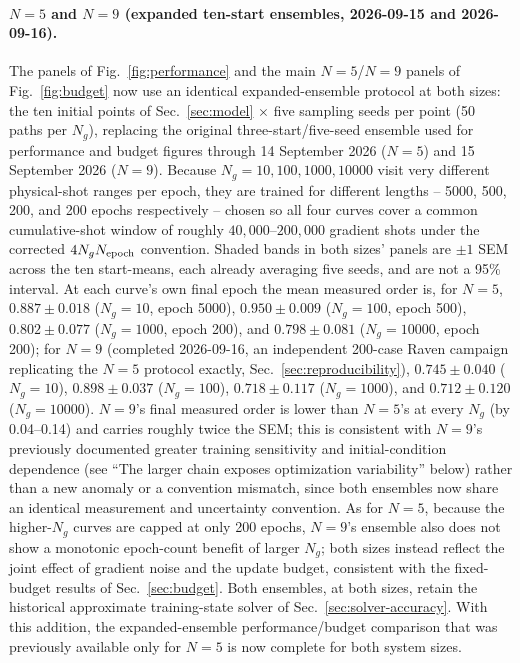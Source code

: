 \documentclass[11pt]{article}
\begin{document}
\paragraph{$N=5$ and $N=9$ (expanded ten-start ensembles, 2026-09-15 and 2026-09-16).}
The panels of Fig.~\ref{fig:performance} and the main $N=5$/$N=9$ panels of
Fig.~\ref{fig:budget} now use an identical expanded-ensemble protocol at both sizes:
the ten initial points of Sec.~\ref{sec:model} $\times$ five sampling seeds per point
(50 paths per $N_g$), replacing the original three-start/five-seed ensemble used for
performance and budget figures through 14 September 2026 ($N=5$) and 15 September
2026 ($N=9$).  Because $N_g=10,100,1000,10000$ visit very different physical-shot
ranges per epoch, they are trained for different lengths -- 5000, 500, 200, and 200
epochs respectively -- chosen so all four curves cover a common cumulative-shot
window of roughly $40{,}000$--$200{,}000$ gradient shots under the corrected
$4N_gN_{\rm epoch}$ convention.  Shaded bands in both sizes' panels are $\pm1$ SEM
across the ten start-means, each already averaging five seeds, and are not a 95\%
interval.  At each curve's own final epoch the mean measured order is, for $N=5$,
$0.887\pm0.018$ ($N_g=10$, epoch 5000), $0.950\pm0.009$ ($N_g=100$, epoch 500),
$0.802\pm0.077$ ($N_g=1000$, epoch 200), and $0.798\pm0.081$ ($N_g=10000$, epoch
200); for $N=9$ (completed 2026-09-16, an independent 200-case Raven campaign
replicating the $N=5$ protocol exactly, Sec.~\ref{sec:reproducibility}),
$0.745\pm0.040$ ($N_g=10$), $0.898\pm0.037$ ($N_g=100$), $0.718\pm0.117$
($N_g=1000$), and $0.712\pm0.120$ ($N_g=10000$).  $N=9$'s final measured order is
lower than $N=5$'s at every $N_g$ (by 0.04--0.14) and carries roughly twice the SEM;
this is consistent with $N=9$'s previously documented greater training sensitivity
and initial-condition dependence (see ``The larger chain exposes optimization
variability'' below) rather than a new anomaly or a convention mismatch, since both
ensembles now share an identical measurement and uncertainty convention.  As for
$N=5$, because the higher-$N_g$ curves are capped at only 200 epochs, $N=9$'s
ensemble also does not show a monotonic epoch-count benefit of larger $N_g$; both
sizes instead reflect the joint effect of gradient noise and the update budget,
consistent with the fixed-budget results of Sec.~\ref{sec:budget}.  Both ensembles,
at both sizes, retain the historical approximate training-state solver of
Sec.~\ref{sec:solver-accuracy}.  With this addition, the expanded-ensemble
performance/budget comparison that was previously available only for $N=5$ is now
complete for both system sizes.
\end{document}

